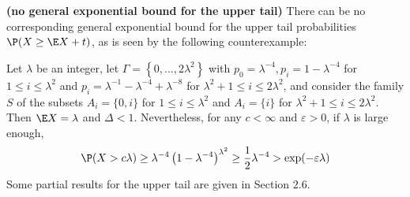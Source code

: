 \documentclass{article}
\newcommand{\bfs}[1]{\textbf{({#1})}}
\begin{document}
\begin{rema}{\bfs{no general exponential bound for the upper tail}}
 There can be no corresponding general exponential bound for the upper tail probabilities $\P (X \geq \E X+t)$, as is seen by the following counterexample:
 
 Let $\lambda$ be an integer, let $\Gamma=\left\{0, \ldots, 2 \lambda^{2}\right\}$ with $p_{0}=\lambda^{-4}, p_{i}=1-\lambda^{-4}$ for $1 \leq i \leq \lambda^{2}$ and
$p_{i}=\lambda^{-1}-\lambda^{-4}+\lambda^{-8}$ for $\lambda^{2}+1 \leq i \leq 2 \lambda^{2}$, and consider the family $S$ of the
subsets $A_{i}=\{0, i\}$ for $1 \leq i \leq \lambda^{2}$ and $A_{i}=\{i\}$ for $\lambda^{2}+1 \leq i \leq 2 \lambda^{2}$. Then
$\E X=\lambda$ and $\Delta<1$. Nevertheless, for any $c<\infty$ and $\varepsilon>0$, if $\lambda$ is large enough,
$$
\P (X>c \lambda) \geq \lambda^{-4}\left(1-\lambda^{-4}\right)^{\lambda^{2}} \geq \frac{1}{2} \lambda^{-4}>\exp (-\varepsilon \lambda)
$$
Some partial results for the upper tail are given in Section $2.6$.
\end{rema}
\end{document}

